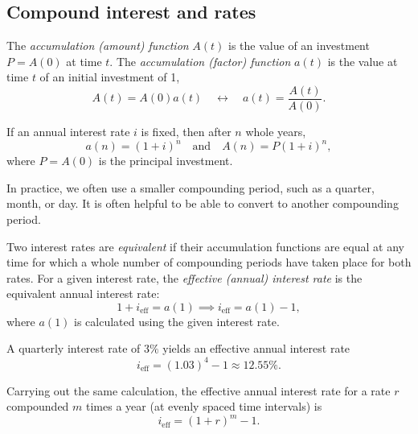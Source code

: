 \subsection{Compound interest and rates}

\begin{defn}
The \emph{accumulation (amount) function} $A(t)$ is the value of an investment $P = A(0)$ at time $t$. The \emph{accumulation (factor) function} $a(t)$ is the value at time $t$ of an initial investment of 1,
\begin{equation}
A(t) = A(0)a(t)\quad\longleftrightarrow\quad a(t) = \frac{A(t)}{A(0)}.
\end{equation}
\end{defn}

\begin{example}
If an annual interest rate $i$ is fixed, then after $n$ whole years,
\begin{equation}
a(n) = (1 + i)^n\quad\text{and}\quad A(n) = P(1 + i)^n,
\end{equation}
where $P = A(0)$ is the principal investment.
\end{example}

In practice, we often use a smaller compounding period, such as a quarter, month, or day. It is often helpful to be able to convert to another compounding period.

\begin{defn}
Two interest rates are \emph{equivalent} if their accumulation functions are equal at any time for which a whole number of compounding periods have taken place for both rates. For a given interest rate, the \emph{effective (annual) interest rate} is the equivalent annual interest rate:
\begin{equation}
1 + i_{\text{eff}} = a(1)\implies i_{\text{eff}} = a(1) - 1,
\end{equation}
where $a(1)$ is calculated using the given interest rate.
\end{defn}

\begin{example}
A quarterly interest rate of $3\%$ yields an effective annual interest rate
\begin{equation}
i_{\text{eff}} = (1.03)^4 - 1\approx 12.55\%.
\end{equation}
\end{example}

Carrying out the same calculation, the effective annual interest rate for a rate $r$ compounded $m$ times a year (at evenly spaced time intervals) is
\begin{equation}
i_{\text{eff}} = (1 + r)^m - 1.
\end{equation}

